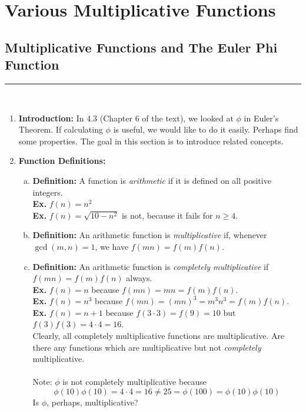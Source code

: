 \documentclass[class=article, crop=false]{standalone}
\begin{document}
    
\section{Various Multiplicative Functions}

\subsection{Multiplicative Functions and The Euler Phi Function}
\rule{\textwidth}{1pt}\\
\begin{enumerate}
\item \textbf{Introduction:}
In 4.3 (Chapter 6 of the text), we looked at $\phi$ in Euler's Theorem.
If calculating $\phi$ is useful, we would like to do it easily. Perhaps
find some properties. The goal in this section is to introduce related concepts.

\item \textbf{Function Definitions:}
\begin{enumerate}[(a)]
	\item \textbf{Definition:}
	A function is \emph{arithmetic} if it is defined on all positive integers.\\
	\textbf{Ex.} $f(n) = n^2$\\
	\textbf{Ex.} $f(n) = \sqrt{10-n^2}$ is not, because it fails for $n\geq 4$.

	\item \textbf{Definition:}
	An arithmetic function is \emph{multiplicative} if, whenever $\gcd(m,n)=1$,
	we have $f(mn)= f(m)f(n)$.

	\item \textbf{Definition:}
	An arithmetic function is \emph{completely multiplicative} if
	$f(mn) = f(m)f(n)$ always. \\
	\textbf{Ex.} $f(n)=n$ because $f(mn) = mn = f(m)f(n)$. \\
	\textbf{Ex.} $f(n)=n^3$ because $f(mn) = (mn)^3 = m^3 n^3 = f(m) f(n)$. \\
	\textbf{Ex.} $f(n)=n+1$ because $f(3\cdot 3)=f(9)=10$ but $f(3)f(3)=4\cdot4=16$. \\
	Clearly, all completely multiplicative functions are multiplicative. Are there any functions which are
	multiplicative but not \emph{completely} multiplicative.\\\\
	Note: $\phi$ is not completely multiplicative because 
	$$\phi(10)\phi(10)=4\cdot 4= 16\neq 25=\phi(100) = \phi(10)\phi(10)$$
	Is $\phi$, perhaps, multiplicative?
	

\end{enumerate}
\end{enumerate}
\end{document}
